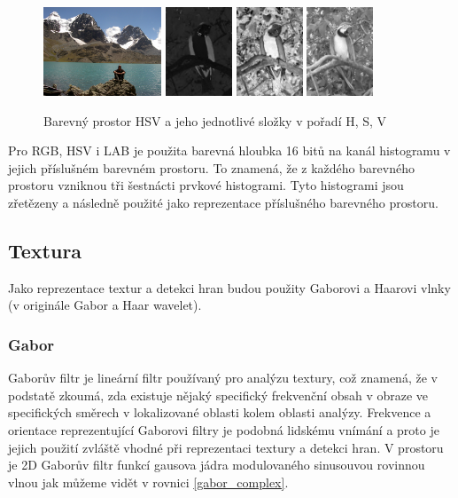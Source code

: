 \documentclass[czech,BP]{thesiskiv}
\begin{document}
\begin{figure}[H]
		\centering
		\includegraphics[height=100px]{./img/img_histogram.jpg}
		\includegraphics[height=100px]{./img/hsv_h.jpg}
		\includegraphics[height=100px]{./img/hsv_s.jpg}
		\includegraphics[height=100px]{./img/hsv_v.jpg}	
		\caption{Barevný prostor HSV a jeho jednotlivé složky v pořadí H, S, V}
\end{figure}

\par Pro RGB, HSV i LAB je použita barevná hloubka 16 bitů na kanál histogramu v jejich příslušném barevném prostoru. To znamená, že z každého barevného prostoru vzniknou tři šestnácti prvkové histogrami. Tyto histogrami jsou zřetězeny a následně použité jako reprezentace příslušného barevného prostoru.

\subsection{Textura}
\par Jako reprezentace textur a detekci hran budou použity Gaborovi a Haarovi vlnky (v originále Gabor a Haar wavelet). 

\subsubsection{Gabor}
\par Gaborův filtr je lineární filtr používaný pro analýzu textury, což znamená, že v podstatě zkoumá, zda existuje nějaký specifický frekvenční obsah v obraze ve specifických směrech v lokalizované oblasti kolem oblasti analýzy. Frekvence a orientace reprezentující Gaborovi filtry je podobná lidskému vnímání a proto je jejich použití zvláště vhodné při reprezentaci textury a detekci hran. V prostoru je 2D Gaborův filtr funkcí gausova jádra modulovaného sinusouvou rovinnou vlnou jak můžeme vidět v rovnici \ref{gabor_complex}.
\end{document}
